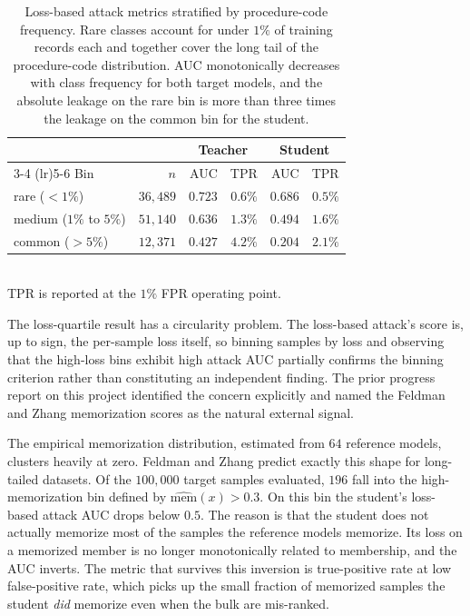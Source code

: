 \documentclass[conference]{IEEEtran}
\begin{document}
\begin{table}[t]
\caption{Loss-based attack metrics stratified by procedure-code frequency. Rare classes account for under $1\%$ of training records each and together cover the long tail of the procedure-code distribution. AUC monotonically decreases with class frequency for both target models, and the absolute leakage on the rare bin is more than three times the leakage on the common bin for the student.}
\label{tab:freq}
\centering
\footnotesize
\begin{tabular}{lrrrrr}
\toprule
& & \multicolumn{2}{c}{Teacher} & \multicolumn{2}{c}{Student} \\
\cmidrule(lr){3-4} \cmidrule(lr){5-6}
Bin & $n$ & AUC & TPR & AUC & TPR \\
\midrule
rare ($<1\%$)        & $36{,}489$ & $0.723$ & $0.6\%$ & $0.686$ & $0.5\%$ \\
medium ($1\%$ to $5\%$) & $51{,}140$ & $0.636$ & $1.3\%$ & $0.494$ & $1.6\%$ \\
common ($>5\%$)      & $12{,}371$ & $0.427$ & $4.2\%$ & $0.204$ & $2.1\%$ \\
\bottomrule
\end{tabular}
\\[2pt]
{\footnotesize TPR is reported at the $1\%$ FPR operating point.}
\end{table}

The loss-quartile result has a circularity problem. The loss-based attack's score is, up to sign, the per-sample loss itself, so binning samples by loss and observing that the high-loss bins exhibit high attack AUC partially confirms the binning criterion rather than constituting an independent finding. The prior progress report on this project identified the concern explicitly and named the Feldman and Zhang memorization scores as the natural external signal.

The empirical memorization distribution, estimated from $64$ reference models, clusters heavily at zero. Feldman and Zhang predict exactly this shape for long-tailed datasets. Of the $100{,}000$ target samples evaluated, $196$ fall into the high-memorization bin defined by $\widehat{\mathrm{mem}}(x) > 0.3$. On this bin the student's loss-based attack AUC drops below $0.5$. The reason is that the student does not actually memorize most of the samples the reference models memorize. Its loss on a memorized member is no longer monotonically related to membership, and the AUC inverts. The metric that survives this inversion is true-positive rate at low false-positive rate, which picks up the small fraction of memorized samples the student \emph{did} memorize even when the bulk are mis-ranked.
\end{document}
